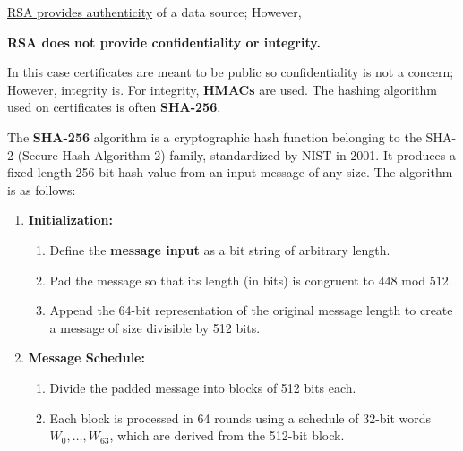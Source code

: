 \newpage

\begin{theo}

    \underline{RSA provides authenticity} of a data source; However,
    \begin{center}
        \textbf{RSA does not provide confidentiality or integrity.}
    \end{center}
    \noindent
\end{theo}

\noindent
In this case certificates are meant to be public so confidentiality is not a concern;
However, integrity is. For integrity, \textbf{HMACs} are used. The hashing algorithm 
used on certificates is often \textbf{SHA-256}.

\begin{Def}

    \label{def:sha256}
    The \textbf{SHA-256} algorithm is a cryptographic hash function belonging to the SHA-2 (Secure Hash Algorithm 2) family, standardized by NIST in 2001.  
    It produces a fixed-length 256-bit hash value from an input message of any size. The algorithm is as follows:
    \begin{enumerate}
        \item \textbf{Initialization:}
        \begin{enumerate}
            \item Define the \textbf{message input} as a bit string of arbitrary length.
            \item Pad the message so that its length (in bits) is congruent to $448$ mod $512$.
            \item Append the 64-bit representation of the original message length to create a message of size divisible by 512 bits.
        \end{enumerate}
        
        \item \textbf{Message Schedule:}
        \begin{enumerate}
            \item Divide the padded message into blocks of 512 bits each.
            \item Each block is processed in 64 rounds using a schedule of 32-bit words $W_0, \dots, W_{63}$, which are derived from the 512-bit block.
        \end{enumerate}


\end{enumerate}
\end{Def}
